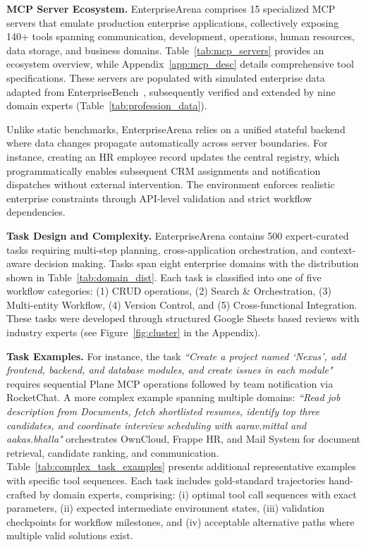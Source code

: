 \documentclass{article}
\theoremstyle{plain}
\theoremstyle{definition}
\theoremstyle{remark}
\begin{document}
\textbf{MCP Server Ecosystem.} EnterpriseArena comprises 15 specialized MCP servers that emulate production enterprise applications, collectively exposing 140+ tools spanning communication, development, operations, human resources, data storage, and business domains. Table~\ref{tab:mcp_servers} provides an ecosystem overview, while Appendix~\ref{app:mcp_desc} details comprehensive tool specifications. These servers are populated with simulated enterprise data adapted from EnterpriseBench~\cite{vishwakarma2025can}, subsequently verified and extended by nine domain experts (Table~\ref{tab:profession_data}).

Unlike static benchmarks, EnterpriseArena relies on a unified stateful backend where data changes propagate automatically across server boundaries. For instance, creating an HR employee record updates the central registry, which programmatically enables subsequent CRM assignments and notification dispatches without external intervention. The environment enforces realistic enterprise constraints through API-level validation and strict workflow dependencies.


\textbf{Task Design and Complexity.} EnterpriseArena contains 500 expert-curated tasks requiring multi-step planning, cross-application orchestration, and context-aware decision making. 
Tasks span eight enterprise domains with the distribution shown in Table~\ref{tab:domain_dist}. Each task is classified into one of five workflow categories: (1) CRUD operations, (2) Search \& Orchestration, (3) Multi-entity Workflow, (4) Version Control, and (5) Cross-functional Integration. These tasks were developed through structured Google Sheets based reviews with industry experts (see Figure~\ref{fig:cluster} in the Appendix).


\textbf{Task Examples.} For instance, the task \textit{``Create a project named `Nexus', add frontend, backend, and database modules, and create issues in each module"} requires sequential Plane MCP operations followed by team notification via RocketChat. A more complex example spanning multiple domains: \textit{``Read job description from Documents, fetch shortlisted resumes, identify top three candidates, and coordinate interview scheduling with aarav.mittal and aakas.bhalla"} orchestrates OwnCloud, Frappe HR, and Mail System for document retrieval, candidate ranking, and communication. Table~\ref{tab:complex_task_examples} presents additional representative examples with specific tool sequences.
Each task includes gold-standard trajectories hand-crafted by domain experts, comprising: (i) optimal tool call sequences with exact parameters, (ii) expected intermediate environment states, (iii) validation checkpoints for workflow milestones, and (iv) acceptable alternative paths where multiple valid solutions exist.
\end{document}
